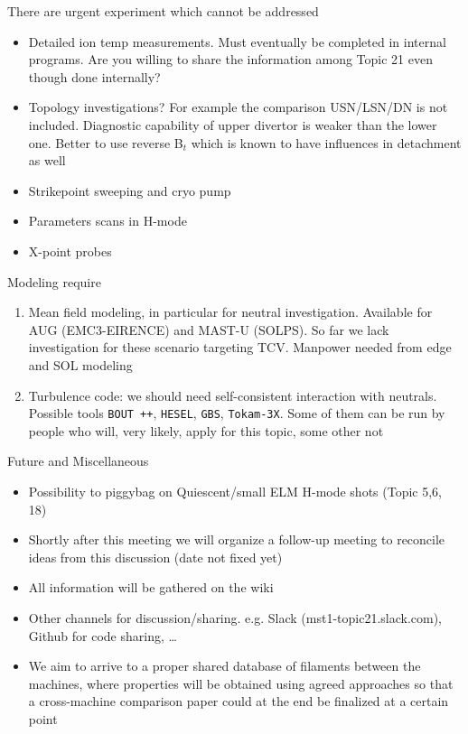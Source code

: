 \documentclass[10pt, compress]{beamer}
\begin{document}
\begin{frame}{There are urgent experiment which cannot be addressed}
\begin{itemize}
	\item Detailed ion temp measurements. Must eventually be
          completed in internal programs. Are you willing to share the
          information among Topic 21 even though done internally?
	\item Topology investigations? For example the comparison
          USN/LSN/DN is not included. Diagnostic capability of upper
          divertor is weaker than the lower one.
          Better to use reverse B$_t$  which is known
          to have influences in detachment as
          well \parencite{McLean}
	\item Strikepoint sweeping and cryo pump
	\item Parameters scans in H-mode
	\item X-point probes
\end{itemize}
\end{frame}

\begin{frame}{Modeling require}
  \begin{enumerate}
    \item Mean field modeling, in particular for neutral investigation.
      Available for AUG (EMC3-EIRENCE) and
      MAST-U (SOLPS). So far we lack investigation for these scenario
      targeting TCV. Manpower needed from edge and SOL modeling
    \item Turbulence code: we should need self-consistent interaction
      with neutrals. Possible tools \texttt{BOUT ++}, \texttt{HESEL},
      \texttt{GBS}, \texttt{Tokam-3X}.
      Some of them can be run by people who will, very
      likely, apply for this topic, some other not
  \end{enumerate}
\end{frame}

\begin{frame}{Future and Miscellaneous}
	\begin{itemize}
		\item Possibility to piggybag on
                  Quiescent/small ELM H-mode shots (Topic 5,6, 18)
		\item Shortly after this meeting we will organize
                  a follow-up meeting to reconcile ideas
                  from this discussion (date not fixed yet)
		\item All information will be gathered on the wiki
                \item Other channels for discussion/sharing. e.g. Slack
                  (mst1-topic21.slack.com), Github for code sharing, \ldots
		\item We aim to arrive to a proper shared database of
                  filaments between the machines, where properties
                  will be obtained using agreed approaches so that a
                  cross-machine comparison paper could at the end be
                  finalized at a certain point		
	\end{itemize}
\end{frame}
\end{document}
